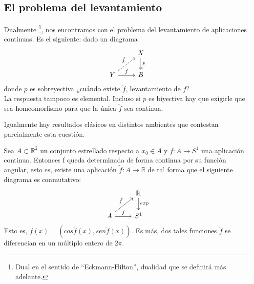 \subsection*{El problema del levantamiento}\label{c1:lev}
Dualmente \footnote{Dual en el sentido de ``Eckmann-Hilton'', dualidad que se definirá más adelante.},
nos encontramos con el problema del levantamiento de aplicaciones continuas. Es el siguiente: dado un diagrama
$$
\begin{tikzcd}
	{}	& X \dar[two heads]{p} \\
	Y \urar[dashed]{\tilde{f}} \rar{f} & B
\end{tikzcd}
$$
donde $p$ es sobreyectiva ¿cuándo existe $\tilde{f}$, levantamiento de $f$?\\ 
La respuesta tampoco es elemental. Incluso si $p$ es biyectiva hay que exigirle que sea homeomorfismo para que la única $\tilde{f}$ sea continua.\par

Igualmente hay resultados clásicos en distintos ambientes que contestan parcialmente esta cuestión.

\begin{teor} 
Sea $A \subset \mathbb{R}^2$ un conjunto estrellado respecto a $x_{0} \in A$ y $f : A \longrightarrow S^{1}$ una aplicación continua. Entonces f queda determinada de forma continua por su función angular, esto es, existe una aplicación $\tilde{f} : A \longrightarrow \mathbb{R}$ de tal forma que el siguiente diagrama es conmutativo:
$$
\begin{tikzcd}
	{}	& \mathbb{R} \dar{exp} \\
	A \urar{\tilde{f}} \rar{f} & S^1
\end{tikzcd}
$$
Esto es, $f(x) = (cos\tilde{f}(x), sen\tilde{f}(x))$. Es más, dos tales funciones $\tilde{f}$ se diferencian en un múltiplo entero de $2\pi$.
\end{teor}

